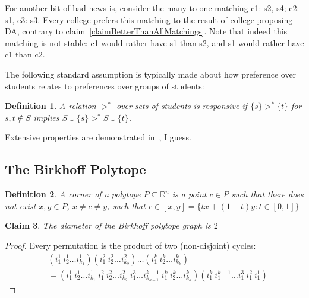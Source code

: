 \documentclass[12pt]{article}
\newcommand{\R}{\mathbb{R}}
\newtheorem{definition}{Definition}[section]
\newtheorem{claim}[definition]{Claim}
\begin{document}
    For another bit of bad news is, consider the many-to-one matching
    c1: s2, s4; c2: s1, c3: s3. Every college prefers this matching to the
    result of college-proposing DA, contrary to
    claim~\ref{claimBetterThanAllMatchings}.
    Note that indeed this matching is not stable: c1 would rather have s1
    than s2, and s1 would rather have c1 than c2.


    The following standard assumption is typically made about how preference
    over students relates to preferences over groups of students:
    \begin{definition}
      A relation $>^*$ over sets of students is \emph{responsive}
      if $\{s\} >^* \{t\}$ for $s,t\notin S$ implies
      $S\cup \{s\} >^* S\cup \{t\}$.
    \end{definition}

    Extensive properties are demonstrated in~\cite{RothCollegeRevisited89},
    I guess.

  \subsection{The Birkhoff Polytope}
    \begin{definition}
      A corner of a polytope $P\subseteq \R^n$ is a point $c\in P$
      such that there does not exist $x,y\in P$, $x\ne c\ne y$,
      such that $c\in [x,y] = \{tx + (1-t)y : t\in [0,1]\}$
    \end{definition}

    \begin{claim}
      The diameter of the Birkhoff polytope graph is $2$
    \end{claim}
    \begin{proof}
      Every permutation is the product of two (non-disjoint) cycles:
      \begin{align*}
        & (i^1_1\ i^1_2\ldots i^1_{k_1})
          (i^2_1\ i^2_2\ldots i^2_{k_2})
          \ldots (i^k_1\ i^k_2\ldots i^k_{k_k})
        \\ & = (i^1_1\ i^1_2\ldots i^1_{k_1} \ %
          i^2_1\ i^2_2\ldots i^2_{k_2} \ i^3_1 %
          \ldots i^{k-1}_{k_{k-1}}\ i^k_1\ i^k_2\ldots i^k_{k_k})
          (i^k_{1}\ i^{k-1}_1 \ldots i^3_1\ i^2_1\ i^1_1 )
      \end{align*}
    \end{proof}







  {}
  
\end{document}

